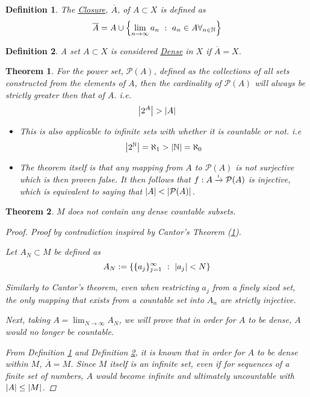 \documentclass[]{article}
\newcommand{\N}{\mathbb{N}}
\newcommand{\toI}{\xrightarrow{\textsf{\tiny I}}}
\newcommand{\st}{\ : \ }
\newtheorem{definition}{Definition}
\newtheorem{theorem}{Theorem}
\begin{document}

\begin{definition}\label{def:closure}
    The \underline{\emph{Closure}}, $\overline{A}$, of $A \subset X$ is defined as
    \[
        \overline{A} = A \cup \qty{
            \lim_{n\to\infty} a_n \st a_n \in A \forall_{n \in \N}
        }
    \]
\end{definition}

\begin{definition}\label{def:dense}
    A set $A \subset X$ is considered \underline{\emph{Dense}} in $X$ if $\overline{A} = X$.
\end{definition}

\begin{theorem}\label{thm:cantor}
    For the power set, $\mathcal{P}(A)$, 
    defined as the collections of all sets constructed from the elements of $A$, 
    then the cardinality of $\mathcal{P}(A)$ will always be strictly greater then that of $A$.
    i.e.\[
        \abs{2^{A}} > \abs{A}
    \]
    \begin{itemize}
        \item This is also applicable to infinite sets with whether it is countable or not.
        i.e\[
            \abs{2^\N} = \aleph_1 > \abs{\N} = \aleph_0
        \]
        \item The theorem itself is that any mapping from $A$ to $\mathcal{P}(A)$ is not surjective which is then proven false.
        It then follows that $f : A \toI \mathcal{P}(A)$ is injective, 
        which is equivalent to saying that $\abs{A} < \abs{\mathcal{P}(A)}$.
    \end{itemize}
\end{theorem}

\begin{theorem}
    $M$ does not contain any dense countable subsets.
    \begin{proof}
        Proof by contradiction inspired by Cantor's Theorem (\ref{thm:cantor}).

        Let $A_N \subset M$ be defined as 
        \[
            A_N := \{\{a_j\}_{j=1}^{\infty} \st \abs{a_j} < N\}
        \]

        Similarly to Cantor's theorem, even when restricting $a_j$ from a finely sized set,
        the only mapping that exists from a countable set into $A_n$ are strictly injective. 
        
        Next, taking $A = \lim_{N \to \infty} A_N$, 
        we will prove that in order for $A$ to be dense, $A$ would no longer be countable.

        From Definition \ref{def:closure} and Definition \ref{def:dense}, 
        it is known that in order for $A$ to be dense within $M$, 
        $\overline{A} = M$. 
        Since $M$ itself is an infinite set, 
        even if for sequences of a finite set of numbers,
        $A$ would become infinite and ultimately uncountable with $\abs{A} \leq \abs{M}$.
    \end{proof}
\end{theorem}
\end{document}
